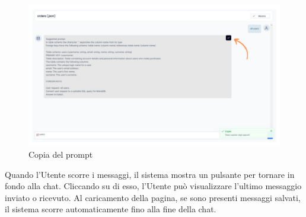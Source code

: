 \begin{figure}[H]
  \centering
  \includegraphics[width=1\textwidth]{assets/copia.png}
  \caption{Copia del prompt}
\end{figure}

 \label{sec:scorrimento-chat}

\par Quando l'Utente scorre i messaggi, il sistema mostra un pulsante per tornare in fondo alla chat. Cliccando su di esso, l'Utente può visualizzare l'ultimo messaggio inviato o ricevuto. Al caricamento della pagina, se sono presenti messaggi salvati, il sistema scorre automaticamente fino alla fine della chat.